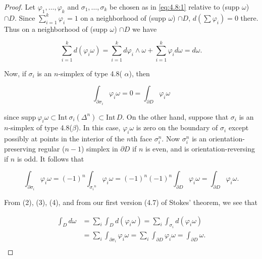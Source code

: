 \begin{proof}
Let $\varphi_{1},\ldots,\varphi_{k}$ and $\sigma_{1},\ldots,\sigma_{k}$ be chosen as in \eqref{eq:4.8:1} relative to (supp $\omega$) $\cap D$. Since $\sum_{i=1}^{k}\varphi_{i}=1$ on a neighborhood of (supp $\omega$) $\cap D$, $d(\sum\varphi_{i})=0$ there. Thus on a neighborhood of (supp $\omega$) $\cap D$ we have

\begin{equation}
\tag{2}\label{eq:4.9:2}
\sum_{i=1}^{k}d(\varphi_{i}\omega)=\sum_{i=1}^{k}d\varphi_{i}\wedge\omega+\sum_{i=1}^{k}\varphi_{i}d\omega=d\omega.
\end{equation}

Now, if $\sigma_{i}$ is an $n$-simplex of type 4.8( $ \alpha $), then

\begin{equation}
\tag{3}\label{eq:4.9:3}
\int_{\partial\sigma_{i}}\varphi_{i}\omega=0=\int_{\partial D}\varphi_{i}\omega
\end{equation}

since $\mathrm{supp} \ \varphi_i \omega \subset \mathrm{Int} \ \sigma_i(\Delta^n) \subset \mathrm{Int} \, D$. On the other hand, suppose that $\sigma_i$ is an $n$-simplex of type 4.8($\beta$). In this case, $\varphi_i \omega$ is zero on the boundary of $\sigma_i$ except possibly at points in the interior of the $n$th face $\sigma_i^n$. Now $\sigma_i^n$ is an orientation-preserving regular ($n-1$) simplex in $\partial D$ if $n$ is even, and is orientation-reversing if $n$ is odd. It follows that

\begin{equation}
\tag{4}\label{eq:4.9:4}
\int_{\partial\sigma_{i}}\varphi_{i}\omega=(-1)^{n}\int_{\sigma_{i}{}^{n}}\varphi_{i}\omega=(-1)^{n}(-1)^{n}\int_{\partial D}\varphi_{i}\omega=\int_{\partial D}\varphi_{i}\omega.
\end{equation}

From (2), (3), (4), and from our first version (4.7) of Stokes' theorem, we see that

\begin{equation}
\tag{5}\label{eq:4.9:5}
\begin{aligned}{\int_{D}d\omega}&{{}=\sum_{i}\int_{D}d(\varphi_{i}\omega)=\sum_{i}\int_{\sigma_{i}}d(\varphi_{i}\omega)}\\ {}&{{}=\sum_{i}\int_{\partial\sigma_{i}}\varphi_{i}\omega=\sum_{i}\int_{\partial D}\varphi_{i}\omega=\int_{\partial D}\omega.}\\ \end{aligned}
\end{equation}

\end{proof}

